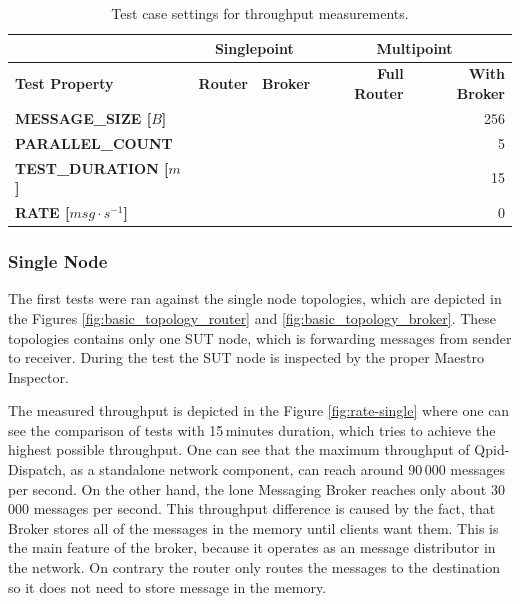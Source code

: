 \begingroup
\setlength{\tabcolsep}{10pt} %
\renewcommand{\arraystretch}{1.35} %
	\begin{table}[H]
	\centering
	\caption{Test case settings for throughput measurements.}
	\label{tab:test_case_throughput}
	\begin{tabular}{|l|r|r|r|r|}
	\hline

	\rowcolor[HTML]{C5E3DF}
	           & \multicolumn{2}{c|}{\textbf{Singlepoint}} & \multicolumn{2}{c|}{\textbf{Multipoint}} \\ \hline
	\rowcolor[HTML]{C5E3DF}
	\textbf{Test Property} & \textbf{Router}            & \textbf{Broker}                 & \textbf{Full Router}            & \textbf{With Broker}           \\ \hline
	\textbf{MESSAGE\_SIZE [$B$]}                        & \multicolumn{4}{r|}{256}                    \\ \hline
	\textbf{PARALLEL\_COUNT}                            & \multicolumn{4}{r|}{5}                      \\ \hline
	\textbf{TEST\_DURATION [$m$]}                       & \multicolumn{4}{r|}{15}                    \\ \hline
	\textbf{RATE [$msg \cdot s^{-1}$]}                                       & \multicolumn{4}{r|}{0}                   		\\ \hline
	\end{tabular}
	\end{table}
\endgroup


\subsubsection*{Single Node}
The first tests were ran against the single node topologies, which are depicted in the Figures \ref{fig:basic_topology_router} and \ref{fig:basic_topology_broker}. These topologies contains only one SUT node, which is forwarding messages from sender to receiver. During the test the SUT node is inspected by the proper Maestro Inspector.

The measured throughput is depicted in the Figure \ref{fig:rate-single} where one can see the comparison of tests with 15\,minutes duration, which tries to achieve the highest possible throughput. One can see that the maximum throughput of Qpid-Dispatch, as a standalone network component, can reach around 90\,000 messages per second. On the other hand, the lone Messaging Broker reaches only about 30\,000 messages per second. This throughput difference is caused by the fact, that Broker stores all of the messages in the memory until clients want them. This is the main feature of the broker, because it operates as an message distributor in the network. On contrary the router only routes the messages to the destination so it does not need to store message in the memory.

